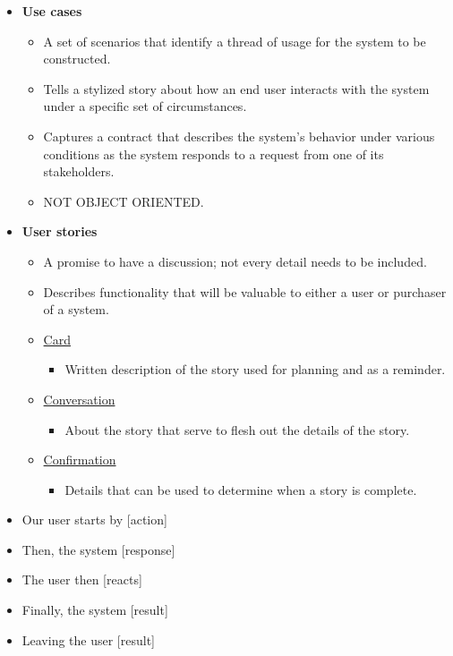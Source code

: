 \documentclass[10pt]{article}
\begin{document}
\begin{multicols}{5}
\begin{block}
  \begin{itemize}
    \item \textbf{Use cases}
    \begin{itemize}
      \item A set of scenarios that identify a thread of usage for the system to be constructed.
      \item Tells a stylized story about how an end user interacts with the system under a specific set of circumstances.
      \item Captures a contract that describes the system's behavior under various conditions as the system responds to a request from one of its stakeholders.
      \item NOT OBJECT ORIENTED.
    \end{itemize}
    \item \textbf{User stories}
    \begin{itemize}
      \item A promise to have a discussion; not every detail needs to be included.
      \item Describes functionality that will be valuable to either a user or purchaser of a system.
      \item \underline{Card}
      \begin{itemize}
        \item Written description of the story used for planning and as a reminder.
      \end{itemize}
      \item \underline{Conversation}
      \begin{itemize}
        \item About the story that serve to flesh out the details of the story.
      \end{itemize}
      \item \underline{Confirmation}
      \begin{itemize}
        \item Details that can be used to determine when a story is complete.
      \end{itemize}
    \end{itemize}
  \end{itemize}
\end{block}

\begin{block}
  \begin{itemize}
    \item Our user starts by [action]
    \item Then, the system [response]
    \item The user then [reacts]
    \item Finally, the system [result]
    \item Leaving the user [result]
  \end{itemize}
\end{block}



\end{multicols}
\end{document}
